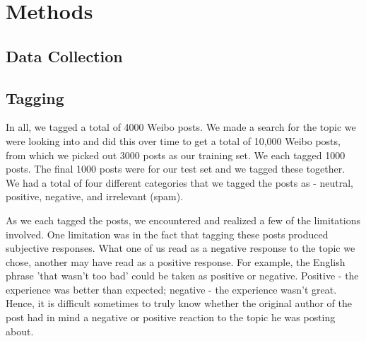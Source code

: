 \documentclass[11pt]{article}
\newcommand{\1}[1]{{\mathbf 1}\left\{#1\right\}}        %
\begin{document}
\section{Methods}



\subsection{Data Collection}




\subsection{Tagging}


In all, we tagged a total of 4000 Weibo posts.  We made a search for the topic we were looking into and did this over time to get a total of 10,000 Weibo posts, from which we picked out 3000 posts as our training set.  We each tagged 1000 posts.  The final 1000 posts were for our test set and we tagged these together. We had a total of four different categories that we tagged the posts as - neutral, positive, negative, and irrelevant (spam).  

As we each tagged the posts, we encountered and realized a few of the limitations involved. One limitation was in the fact that tagging these posts produced subjective responses.  What one of us read as a negative response to the topic we chose, another may have read as a positive response.  For example, the English phrase 'that wasn't too bad' could be taken as positive or negative.  Positive - the experience was better than expected; negative - the experience wasn't great. Hence, it is difficult sometimes to truly know whether the original author of the post had in mind a negative or positive reaction to the topic he was posting about.  
\end{document}
